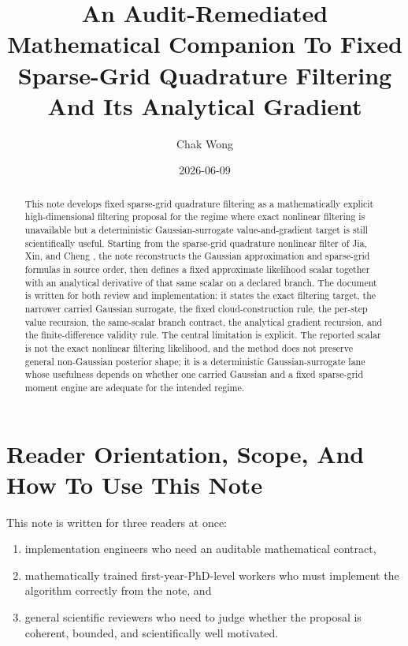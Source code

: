 \documentclass[11pt]{article}
\title{An Audit-Remediated Mathematical Companion To Fixed Sparse-Grid Quadrature Filtering And Its Analytical Gradient}
\author{Chak Wong}
\date{2026-06-09}
\numberwithin{equation}{section}
\begin{document}
\maketitle

\begin{abstract}
This note develops fixed sparse-grid quadrature filtering as a
mathematically explicit high-dimensional filtering proposal for the regime where
exact nonlinear filtering is unavailable but a deterministic Gaussian-surrogate
value-and-gradient target is still scientifically useful.  Starting from the
sparse-grid quadrature nonlinear filter of Jia, Xin, and Cheng
\cite{jia2012sparsegrid}, the note reconstructs the Gaussian approximation and
sparse-grid formulas in source order, then defines a fixed approximate
likelihood scalar together with an analytical derivative of that same scalar on
a declared branch.  The document is written for both review and implementation:
it states the exact filtering target, the narrower carried Gaussian surrogate,
the fixed cloud-construction rule, the per-step value recursion, the
same-scalar branch contract, the analytical gradient recursion, and the
finite-difference validity rule.  The central limitation is explicit.  The
reported scalar is not the exact nonlinear filtering likelihood, and the method
does not preserve general non-Gaussian posterior shape; it is a deterministic
Gaussian-surrogate lane whose usefulness depends on whether one carried Gaussian
and a fixed sparse-grid moment engine are adequate for the intended regime.
\end{abstract}

\section{Reader Orientation, Scope, And How To Use This Note}
\label{sec:p33-reader-orientation}

This note is written for three readers at once:
\begin{enumerate}[leftmargin=0.28in]
  \item implementation engineers who need an auditable mathematical contract,
  \item mathematically trained first-year-PhD-level workers who must implement
  the algorithm correctly from the note, and
  \item general scientific reviewers who need to judge whether the proposal is
  coherent, bounded, and scientifically well motivated.
\end{enumerate}
\end{document}
